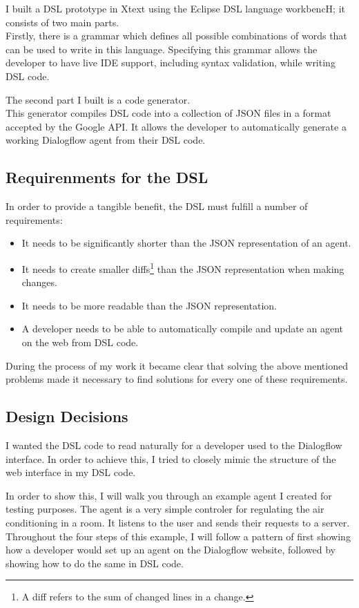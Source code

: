 I built a DSL prototype in Xtext using the Eclipse DSL language workbencH; it consists of two main parts.\\
Firstly, there is a grammar which defines all possible combinations of words that can be used to write in this language.
Specifying this grammar allows the developer to have live IDE support, including syntax validation, while writing DSL code.

The second part I built is a code generator.\\
This generator compiles DSL code into a collection of JSON files in a format accepted by the Google API. It allows the developer to automatically generate a working Dialogflow agent from their DSL code.

\subsection{Requirenments for the DSL}

In order to provide a tangible benefit, the DSL must fulfill a number of requirements:
\begin{itemize}
    \item It needs to be significantly shorter than the JSON representation of an agent.
    \item It needs to create smaller diffs\footnote{A diff refers to the sum of changed lines in a change.} than the JSON representation when making changes.
    \item It needs to be more readable than the JSON representation.
    \item A developer needs to be able to automatically compile and update an agent on the web from DSL code.
\end{itemize}

During the process of my work it became clear that solving the above mentioned problems made it necessary to find solutions for every one of these requirements.

\subsection{Design Decisions}

I wanted the DSL code to read naturally for a developer used to the Dialogflow interface.
In order to achieve this, I tried to closely mimic the structure of the web interface in my DSL code.

In order to show this, I will walk you through an example agent I created for testing purposes. The agent is a very simple controler for regulating the air conditioning in a room. It listens to the user and sends their requests to a server. Throughout the four steps of this example, I will follow a pattern of first showing how a developer would set up an agent on the Dialogflow website, followed by showing how to do the same in DSL code.


